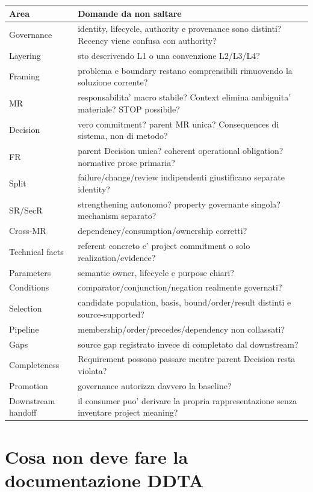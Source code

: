 \documentclass[11pt,a4paper]{article}
\begin{document}
\begin{longtable}{L{39mm}L{101mm}}
\toprule
\textbf{Area} & \textbf{Domande da non saltare} \\
\midrule\endhead
Governance & identity, lifecycle, authority e provenance sono distinti? Recency viene confusa con authority? \\
Layering & sto descrivendo L1 o una convenzione L2/L3/L4? \\
Framing & problema e boundary restano comprensibili rimuovendo la soluzione corrente? \\
MR & responsabilita' macro stabile? Context elimina ambiguita' materiale? STOP possibile? \\
Decision & vero commitment? parent MR unica? Consequences di sistema, non di metodo? \\
FR & parent Decision unica? coherent operational obligation? normative prose primaria? \\
Split & failure/change/review indipendenti giustificano separate identity? \\
SR/SecR & strengthening autonomo? property governante singola? mechanism separato? \\
Cross-MR & dependency/consumption/ownership corretti? \\
Technical facts & referent concreto e' project commitment o solo realization/evidence? \\
Parameters & semantic owner, lifecycle e purpose chiari? \\
Conditions & comparator/conjunction/negation realmente governati? \\
Selection & candidate population, basis, bound/order/result distinti e source-supported? \\
Pipeline & membership/order/precedes/dependency non collassati? \\
Gaps & source gap registrato invece di completato dal downstream? \\
Completeness & Requirement possono passare mentre parent Decision resta violata? \\
Promotion & governance autorizza davvero la baseline? \\
Downstream handoff & il consumer puo' derivare la propria rappresentazione senza inventare project meaning? \\
\bottomrule
\end{longtable}

\section{Cosa non deve fare la documentazione DDTA}
\end{document}
